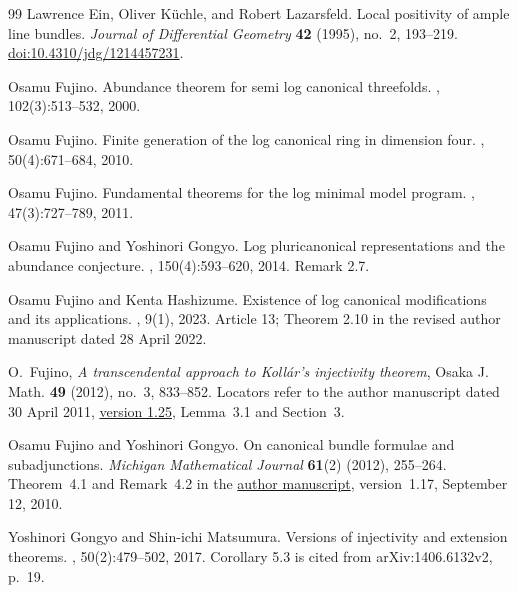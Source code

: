 \begin{thebibliography}{99}
Lawrence Ein, Oliver K\"uchle, and Robert Lazarsfeld.
\newblock Local positivity of ample line bundles.
\newblock \emph{Journal of Differential Geometry} \textbf{42} (1995),
no.~2, 193--219.
\newblock \href{https://doi.org/10.4310/jdg/1214457231}{doi:10.4310/jdg/1214457231}.

Osamu Fujino.
\newblock Abundance theorem for semi log canonical threefolds.
, 102(3):513--532, 2000.

Osamu Fujino.
\newblock Finite generation of the log canonical ring in dimension four.
, 50(4):671--684, 2010.

Osamu Fujino.
\newblock Fundamental theorems for the log minimal model program.
, 47(3):727--789, 2011.

Osamu Fujino and Yoshinori Gongyo.
\newblock Log pluricanonical representations and the abundance conjecture.
, 150(4):593--620, 2014.
\newblock Remark 2.7.

Osamu Fujino and Kenta Hashizume.
\newblock Existence of log canonical modifications and its applications.
, 9(1), 2023.
\newblock Article 13; Theorem 2.10 in the revised author manuscript dated 28 April 2022.

O.~Fujino,
\emph{A transcendental approach to Koll\'ar's injectivity theorem},
Osaka J. Math. \textbf{49} (2012), no.~3, 833--852.
Locators refer to the author manuscript dated 30 April 2011,
\href{https://www.math.kyoto-u.ac.jp/~fujino/kollar1-03.pdf}{version 1.25},
Lemma~3.1 and Section~3.

Osamu Fujino and Yoshinori Gongyo.
\newblock On canonical bundle formulae and subadjunctions.
\newblock \emph{Michigan Mathematical Journal} \textbf{61}(2) (2012), 255--264.
\newblock Theorem~4.1 and Remark~4.2 in the
\href{https://www.math.kyoto-u.ac.jp/~fujino/subadjunction5.pdf}{author manuscript},
version~1.17, September 12, 2010.

Yoshinori Gongyo and Shin-ichi Matsumura.
\newblock Versions of injectivity and extension theorems.
, 50(2):479--502, 2017.
\newblock Corollary 5.3 is cited from arXiv:1406.6132v2, p.~19.


\end{thebibliography}
